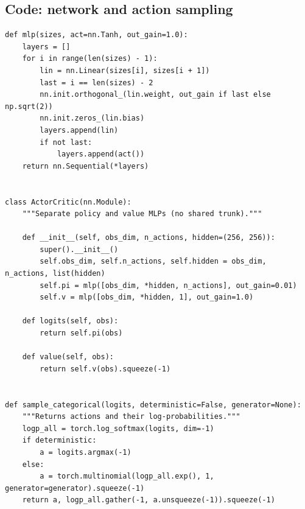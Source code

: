 \documentclass[11pt,a4paper]{article}
\newcommand{\code}[1]{\texttt{#1}}
\begin{document}
\subsection{Code: network and action sampling}
\begin{lstlisting}[title={\code{rl/nets.py} -- mlp, ActorCritic, sample\_categorical (exact)}]
def mlp(sizes, act=nn.Tanh, out_gain=1.0):
    layers = []
    for i in range(len(sizes) - 1):
        lin = nn.Linear(sizes[i], sizes[i + 1])
        last = i == len(sizes) - 2
        nn.init.orthogonal_(lin.weight, out_gain if last else np.sqrt(2))
        nn.init.zeros_(lin.bias)
        layers.append(lin)
        if not last:
            layers.append(act())
    return nn.Sequential(*layers)


class ActorCritic(nn.Module):
    """Separate policy and value MLPs (no shared trunk)."""

    def __init__(self, obs_dim, n_actions, hidden=(256, 256)):
        super().__init__()
        self.obs_dim, self.n_actions, self.hidden = obs_dim, n_actions, list(hidden)
        self.pi = mlp([obs_dim, *hidden, n_actions], out_gain=0.01)
        self.v = mlp([obs_dim, *hidden, 1], out_gain=1.0)

    def logits(self, obs):
        return self.pi(obs)

    def value(self, obs):
        return self.v(obs).squeeze(-1)


def sample_categorical(logits, deterministic=False, generator=None):
    """Returns actions and their log-probabilities."""
    logp_all = torch.log_softmax(logits, dim=-1)
    if deterministic:
        a = logits.argmax(-1)
    else:
        a = torch.multinomial(logp_all.exp(), 1, generator=generator).squeeze(-1)
    return a, logp_all.gather(-1, a.unsqueeze(-1)).squeeze(-1)
\end{lstlisting}
\end{document}
